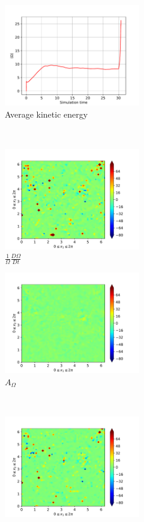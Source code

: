 \begin{figure}[H]
    \begin{subfigure}[H]{0.45\textwidth}
        \includegraphics[height=1.75in]{media/run-cds-65/enst-average1400}
        \caption{Average kinetic energy}
    \end{subfigure}
    ~
    \begin{subfigure}[H]{0.45\textwidth}
        \includegraphics[height=1.75in]{media/run-cds-65/enst-1400}
        \caption{$\frac{1}{\Omega} \frac{D \Omega}{Dt}$}
    \end{subfigure}
    \newline
    \begin{subfigure}{0.45\textwidth}
        \includegraphics[height=1.75in]{media/run-cds-65/A-enst-1400}
        \caption{$A_{\Omega}$}
    \end{subfigure}
    ~
    \begin{subfigure}{0.45\textwidth}
        \includegraphics[height=1.75in]{media/run-cds-65/Pi-enst-1400}

\end{subfigure}
\end{figure}

